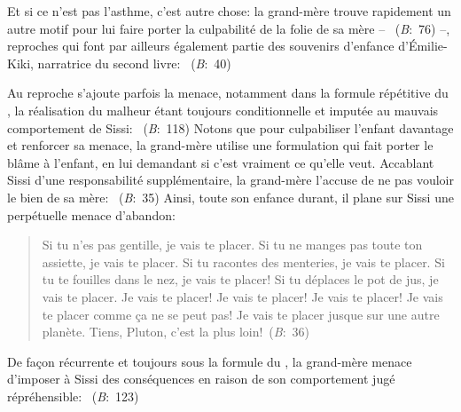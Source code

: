 Et si ce n'est pas l'asthme, c'est autre chose: la grand-mère trouve rapidement un autre motif pour lui faire porter la culpabilité de la folie de sa mère -- ~(\textit{B}:~76) --, reproches qui font par ailleurs également partie des souvenirs d'enfance d'Émilie-Kiki, narratrice du second livre: ~(\textit{B}:~40)
\par
Au reproche s'ajoute parfois la menace, notamment dans la formule répétitive du , la réalisation du malheur étant toujours conditionnelle et imputée au mauvais comportement de Sissi: ~(\textit{B}:~118)
Notons que pour culpabiliser l'enfant davantage et renforcer sa menace, la grand-mère utilise une formulation qui fait porter le blâme à l'enfant, en lui demandant si c'est vraiment ce qu'elle veut.
Accablant Sissi d'une responsabilité supplémentaire, la grand-mère l'accuse de ne pas vouloir le bien de sa mère:
~(\textit{B}:~35)
Ainsi, toute son enfance durant, il plane sur Sissi une perpétuelle menace d'abandon:
\begin{quote}
  \begin{singlespace}
    \small
    Si tu n'es pas gentille, je vais te placer. Si tu ne manges pas toute ton assiette, je vais te placer. Si tu racontes des menteries, je vais te placer. Si tu te fouilles dans le nez, je vais te placer! Si tu déplaces le pot de jus, je vais te placer. Je vais te placer! Je vais te placer! Je vais te placer! Je vais te placer comme ça ne se peut pas! Je vais te placer jusque sur une autre planète. Tiens, Pluton, c'est la plus loin!~(\textit{B}:~36)
    \normalsize
  \end{singlespace}
\end{quote}
De façon récurrente et toujours sous la formule du , la grand-mère menace d'imposer à Sissi des conséquences en raison de son comportement jugé répréhensible: ~(\textit{B}:~123)

